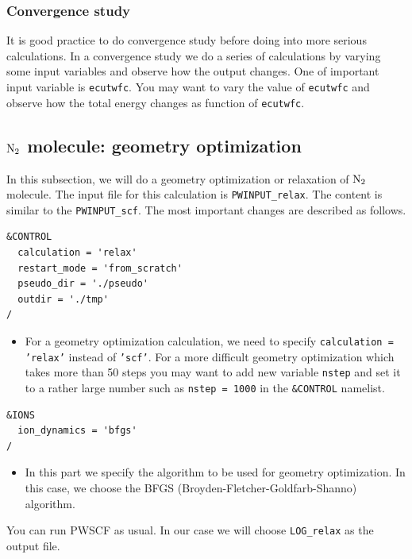 \documentclass[12pt,english]{paper}
\begin{document}
\subsubsection{Convergence study}

It is good practice to do convergence study before doing into more
serious calculations. In a convergence study we do a series of calculations
by varying some input variables and observe how the output changes.
One of important input variable is \texttt{ecutwfc}. You may want
to vary the value of \texttt{ecutwfc} and observe how the total energy
changes as function of \texttt{ecutwfc}.


\subsection{$\ce{N2}$ molecule: geometry optimization}

In this subsection, we will do a geometry optimization or relaxation
of $\ce{N2}$ molecule. The input file for this calculation is \texttt{PWINPUT\_relax}.
The content is similar to the \texttt{PWINPUT\_scf}. The most important
changes are described as follows.

\begin{lstlisting}
&CONTROL
  calculation = 'relax'
  restart_mode = 'from_scratch'
  pseudo_dir = './pseudo'
  outdir = './tmp'
/
\end{lstlisting}

\begin{itemize}
\item For a geometry optimization calculation, we need to specify \texttt{calculation
= 'relax'} instead of \texttt{'scf'}. For a more difficult geometry
optimization which takes more than 50 steps you may want to add new
variable \texttt{nstep} and set it to a rather large number such as
\texttt{nstep = 1000} in the \texttt{\&CONTROL} namelist.
\end{itemize}
\begin{lstlisting}
&IONS
  ion_dynamics = 'bfgs'
/
\end{lstlisting}

\begin{itemize}
\item In this part we specify the algorithm to be used for geometry optimization.
In this case, we choose the BFGS (Broyden-Fletcher-Goldfarb-Shanno)
algorithm.
\end{itemize}
You can run PWSCF as usual. In our case we will choose \texttt{LOG\_relax}
as the output file.
\end{document}
